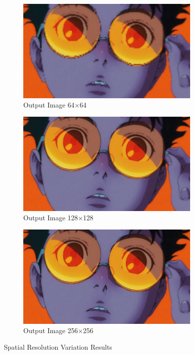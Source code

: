 \documentclass[12pt,a4paper]{article}
\begin{document}
\begin{figure}[H]
  \begin{subfigure}[b]{0.32\textwidth}
    \centering
    \includegraphics[width=\textwidth]{spatial/spatial_reduced_25percent.jpg}
    \caption{Output Image 64×64}
  \end{subfigure}
  \hfill
  \begin{subfigure}[b]{0.32\textwidth}
    \centering
    \includegraphics[width=\textwidth]{spatial/spatial_reduced_50percent.jpg}
    \caption{Output Image 128×128}
  \end{subfigure}
  \hfill
  \begin{subfigure}[b]{0.32\textwidth}
    \centering
    \includegraphics[width=\textwidth]{spatial/spatial_reduced_75percent.jpg}
    \caption{Output Image 256×256}
  \end{subfigure}
  \caption{Spatial Resolution Variation Results}
  \label{fig:spatial_resolution}
\end{figure}
\end{document}
